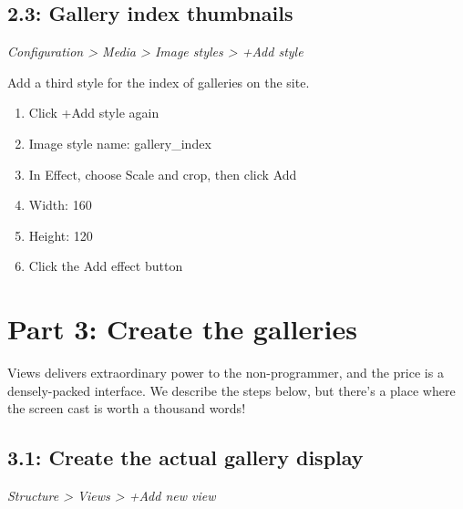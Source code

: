 \documentclass[letterpaper,10pt,english]{sphinxmanual}
\begin{document}
\subsection{2.3: Gallery index thumbnails}
\label{slides:gallery-index-thumbnails}
\emph{Configuration \textgreater{} Media \textgreater{} Image styles \textgreater{} +Add style}

Add a third style for the index of galleries on the site.
\begin{enumerate}
\item {} 
Click +Add style again

\item {} 
Image style name: gallery\_index

\item {} 
In Effect, choose Scale and crop, then click Add

\item {} 
Width: 160

\item {} 
Height: 120

\item {} 
Click the Add effect button

\end{enumerate}


\section{Part 3: Create the galleries}
\label{slides:part-3-create-the-galleries}
Views delivers extraordinary power to the non-programmer, and the price is a densely-packed interface. We describe the steps below, but there's a place where the screen cast is worth a thousand words!


\subsection{3.1: Create the actual gallery display}
\label{slides:create-the-actual-gallery-display}
\emph{Structure \textgreater{} Views \textgreater{} +Add new view}
\end{document}

